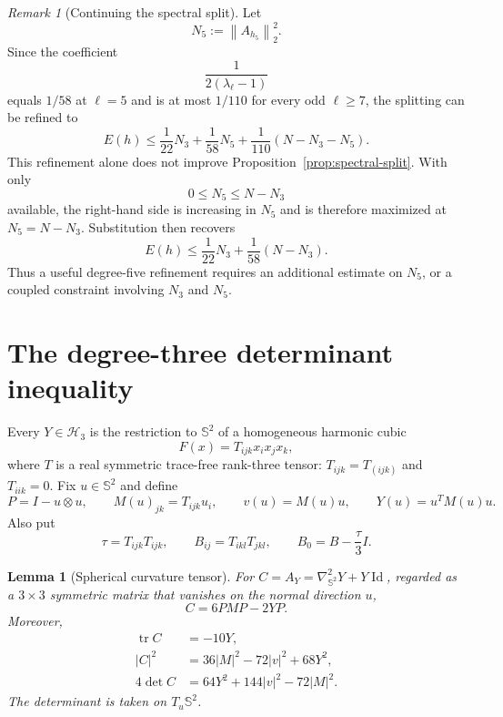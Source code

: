 \documentclass[11pt,reqno]{amsart}
\newtheorem{lemma}[theorem]{Lemma}
\theoremstyle{remark}
\newtheorem{remark}[theorem]{Remark}
\newcommand{\Sph}{\mathbb S^2}
\newcommand{\Harm}{\mathcal H}
\newcommand{\Id}{\operatorname{Id}}
\newcommand{\tr}{\operatorname{tr}}
\newcommand{\norm}[1]{\left\lVert #1\right\rVert}
\newcommand{\abs}[1]{\left\lvert #1\right\rvert}
\begin{document}
\begin{remark}[Continuing the spectral split]\label{rem:degree-five}
Let
\[
 N_5:=\norm{A_{h_5}}_2^2.
\]
Since the coefficient
\[
 \frac{1}{2(\lambda_\ell-1)}
\]
equals $1/58$ at $\ell=5$ and is at most $1/110$ for every odd
$\ell\ge7$, the splitting can be refined to
\[
 E(h)\le
 \frac1{22}N_3+\frac1{58}N_5
 +\frac1{110}(N-N_3-N_5).
\]
This refinement alone does not improve
Proposition~\ref{prop:spectral-split}. With only
\[
 0\le N_5\le N-N_3
\]
available, the right-hand side is increasing in $N_5$ and is therefore
maximized at $N_5=N-N_3$. Substitution then recovers
\[
 E(h)\le
 \frac1{22}N_3+\frac1{58}(N-N_3).
\]
Thus a useful degree-five refinement requires an additional estimate on
$N_5$, or a coupled constraint involving $N_3$ and $N_5$.
\end{remark}

\section{The degree-three determinant inequality}

Every $Y\in\Harm_3$ is the restriction to $\Sph$ of a homogeneous harmonic
cubic
\[
 F(x)=T_{ijk}x_ix_jx_k,
\]
where $T$ is a real symmetric trace-free rank-three tensor:
$T_{ijk}=T_{(ijk)}$ and $T_{iik}=0$. Fix $u\in\Sph$ and define
\[
 P=I-u\otimes u,
 \qquad
 M(u)_{jk}=T_{ijk}u_i,
 \qquad
 v(u)=M(u)u,
 \qquad
 Y(u)=u^TM(u)u.
\]
Also put
\begin{equation}\label{eq:invariants}
 \tau=T_{ijk}T_{ijk},
 \qquad
 B_{ij}=T_{ikl}T_{jkl},
 \qquad
 B_0=B-\frac{\tau}{3}I.
\end{equation}

\begin{lemma}[Spherical curvature tensor]\label{lem:curvature-formula}
For $C=A_Y=\nabla^2_{\Sph}Y+Y\Id$, regarded as a $3\times3$ symmetric matrix
that vanishes on the normal direction $u$,
\begin{equation}\label{eq:C-formula}
 C=6PMP-2YP.
\end{equation}
Moreover,
\begin{align}
 \tr C&=-10Y,\label{eq:trace-C}\\
 \abs{C}^2&=36\abs{M}^2-72\abs{v}^2+68Y^2,\label{eq:norm-C-point}\\
 4\det C&=64Y^2+144\abs{v}^2-72\abs{M}^2.\label{eq:q-compact}
\end{align}
The determinant is taken on $T_u\Sph$.
\end{lemma}
\end{document}
